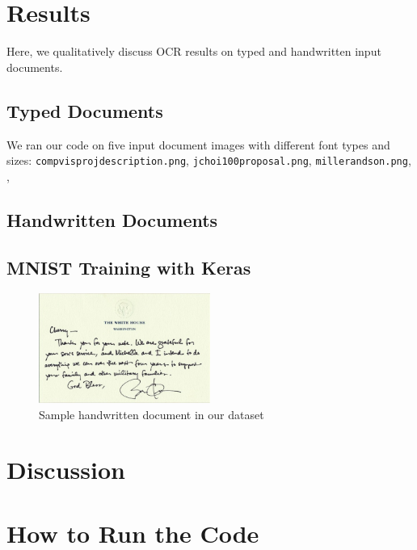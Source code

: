 \documentclass[11pt,letterpaper]{article}
\begin{document}
\section{Results}

Here, we qualitatively discuss OCR results on typed and handwritten input documents.

\subsection{Typed Documents}

We ran our code on five input document images with different font types and sizes: {\tt comp\textunderscore vis\textunderscore proj\textunderscore description.png}, {\tt jchoi100\textunderscore proposal.png}, {\tt miller\textunderscore and\textunderscore son.png}, {\tt }, {\tt}

\subsection{Handwritten Documents}

\subsection{MNIST Training with Keras}

\begin{figure}[t!]
  \centering
  \includegraphics[keepaspectratio, width=0.5\textwidth]{obama4.png}
  \caption{Sample handwritten document in our dataset}
\end{figure}



\section{Discussion}

\section{How to Run the Code}
\end{document}
